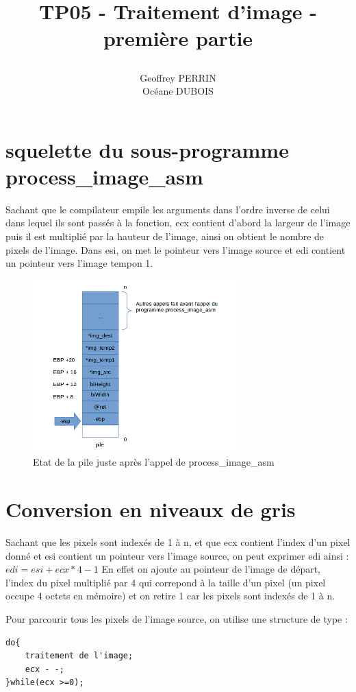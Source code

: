 \documentclass[11pt]{report}
\title{\textbf{TP05 - Traitement d'image - première partie }
\author{Geoffrey PERRIN \\ Océane DUBOIS\\}
\date{}}
\begin{document}
\maketitle

\newpage

\section{squelette du sous-programme process\_image\_asm}

Sachant que le compilateur empile les arguments dans l'ordre inverse de celui dans lequel ils sont passés à la fonction, ecx contient d'abord la largeur de l'image puis il est multiplié par la hauteur de l'image, ainsi on obtient le nombre de pixels de l'image.
Dans esi, on met le pointeur vers l'image source et edi contient un pointeur vers l'image tempon 1.


\begin{figure}[ht]
\includegraphics[width=8cm]{pile.png}
\caption{Etat de la pile juste après l'appel de process\_image\_asm}
\end{figure}

\section{Conversion en niveaux de gris}

Sachant que les pixels sont indexés de 1 à n, et que ecx contient l'index d'un pixel donné et esi contient un pointeur vers l'image source, on peut exprimer edi ainsi : $edi=esi+ecx*4-1$
En effet on ajoute au pointeur de l'image de départ, l'index du pixel multiplié par 4 qui correpond à la taille d'un pixel (un pixel occupe 4 octets en mémoire) et on retire 1 car les pixels sont indexés de 1 à n.


Pour parcourir tous les pixels de l'image source, on utilise une structure de type :
\begin{lstlisting}
do{
	traitement de l'image;
	ecx - -;
}while(ecx >=0);
\end{lstlisting}
\medskip
\end{document}
